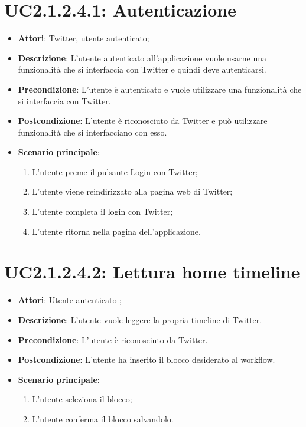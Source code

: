 \section{UC2.1.2.4.1: Autenticazione}
\label{UC2.1.2.4.1}
\begin{itemize}
	\item \textbf{Attori}: Twitter, utente autenticato;
	\item \textbf{Descrizione}: L'utente autenticato all'applicazione vuole usarne una funzionalità che si interfaccia con Twitter e quindi deve autenticarsi. 
	\item \textbf{Precondizione}: L'utente è autenticato e vuole utilizzare una funzionalità che si interfaccia con Twitter.
	\item \textbf{Postcondizione}: L'utente è riconosciuto da Twitter e può utilizzare funzionalità che si interfacciano con esso.
	\item \textbf{Scenario principale}:
	\begin{enumerate} \item L'utente preme il pulsante Login con Twitter;  \item  L'utente viene reindirizzato alla pagina web di Twitter;  \item  L'utente completa il login con Twitter;  \item  L'utente ritorna nella pagina dell'applicazione.\end{enumerate}
\end{itemize}

\section{UC2.1.2.4.2: Lettura home timeline}
\label{UC2.1.2.4.2}
\begin{itemize}
	\item \textbf{Attori}: Utente autenticato ;
	\item \textbf{Descrizione}: L'utente vuole leggere la propria timeline di Twitter.
	\item \textbf{Precondizione}: L'utente è riconosciuto da Twitter.
	\item \textbf{Postcondizione}: L'utente ha inserito il blocco desiderato al workflow.
	\item \textbf{Scenario principale}:
	\begin{enumerate} \item L'utente seleziona il blocco; \item L'utente conferma il blocco salvandolo. \end{enumerate}
\end{itemize}

